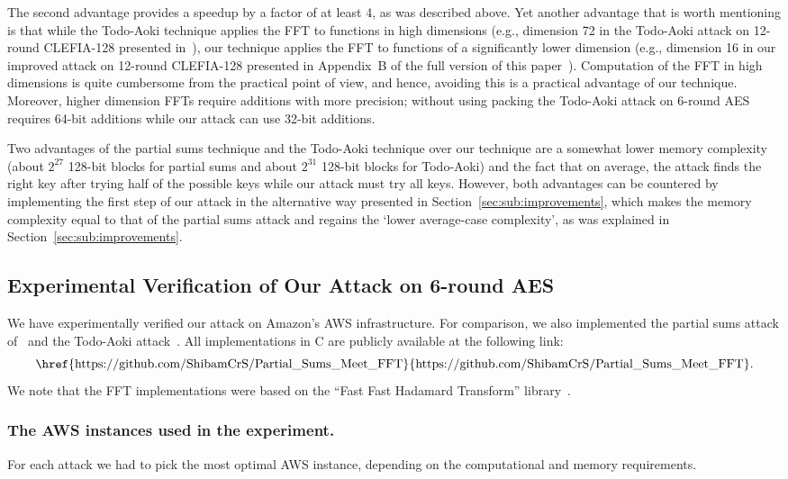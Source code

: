 The second advantage provides a speedup by a factor of at least 4, as was described above. Yet another advantage that is worth mentioning is that while the Todo-Aoki technique applies the FFT to functions in high dimensions (e.g., dimension 72 in the Todo-Aoki attack on 12-round CLEFIA-128 presented in~\cite{CANS:TodAok14}), our technique applies the FFT to functions of a significantly lower dimension (e.g., dimension 16 in our improved attack on 12-round CLEFIA-128 presented in Appendix~B of the full version of this paper~\cite{fullversion}). Computation of the FFT in high dimensions is quite cumbersome from the practical point of view, and hence, avoiding this is a practical advantage of our technique.  Moreover, higher dimension FFTs require additions with more precision; without using packing the Todo-Aoki attack on 6-round AES requires 64-bit additions while our attack can use 32-bit additions.

Two advantages of the partial sums technique and the Todo-Aoki technique over our technique are a somewhat lower memory complexity (about $2^{27}$ 128-bit blocks for partial sums and about $2^{31}$ 128-bit blocks for Todo-Aoki) and the fact that on average, the attack finds the right key after trying half of the possible keys while our attack must try all keys. However, both advantages can be countered by implementing the first step of our attack in the alternative way presented in Section~\ref{sec:sub:improvements}, which makes the memory complexity equal to that of the partial sums attack and regains the `lower average-case complexity', as was explained in Section~\ref{sec:sub:improvements}.

\subsection{Experimental Verification of Our Attack on 6-round AES} 
\label{sec:sub:experiment}

We have experimentally verified our attack on Amazon's AWS infrastructure. For comparison, we also implemented the partial sums attack of~\cite{FSE:FKLSSWW00} and the Todo-Aoki attack~\cite{CANS:TodAok14}. 
All implementations in C are publicly available at the following link: 
\[
    \text{\href{https://github.com/ShibamCrS/Partial\_Sums\_Meet\_FFT}{https://github.com/ShibamCrS/Partial\_Sums\_Meet\_FFT}.}
\]
We note that the FFT implementations were based on the ``Fast Fast Hadamard Transform'' library~\cite{FFHT-Library}. 

\subsubsection{The AWS instances used in the experiment.} For each attack we had to pick the most optimal AWS instance, depending on the computational and memory requirements. 

